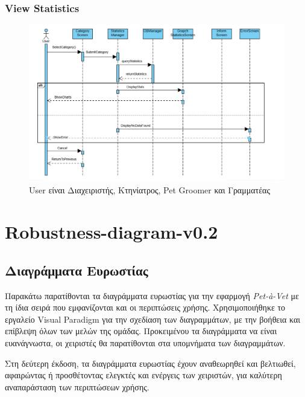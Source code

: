\documentclass[12pt,a4paper,twoside]{book}
\begin{document}
\subsection{View Statistics}
\begin{figure}[H]
    \centering
    \includegraphics[width=\textwidth]{Resources/Sequence Diagram/StatisticsSequence.png}
    \caption{User είναι Διαχειριστής, Κτηνίατρος, Pet Groomer και Γραμματέας}\label{fig:sequence-view-statistics}
\end{figure}

\chapter{Robustness-diagram-v0.2}

\section{Διαγράμματα Ευρωστίας}

Παρακάτω παρατίθονται τα διαγράμματα ευρωστίας για την εφαρμογή \textit{Pet-à-Vet} με τη ίδια σειρά που εμφανίζονται και οι περιπτώσεις χρήσης. Χρησιμοποιήθηκε το εργαλείο Visual Paradigm για την σχεδίαση των διαγραμμάτων, με την βοήθεια και επίβλεψη όλων των μελών της ομάδας. Προκειμένου τα διαγράμματα να είναι ευανάγνωστα, οι χειριστές θα παρατίθονται στα υπομνήματα των διαγραμμάτων. %

Στη δεύτερη έκδοση, τα διαγράμματα ευρωστίας έχουν αναθεωρηθεί και βελτιωθεί, αφαιρώντας ή προσθέτοντας ελεγκτές και ενέργεις των χειριστών, για καλύτερη αναπαράσταση των περιπτώσεων χρήσης. %
\end{document}
